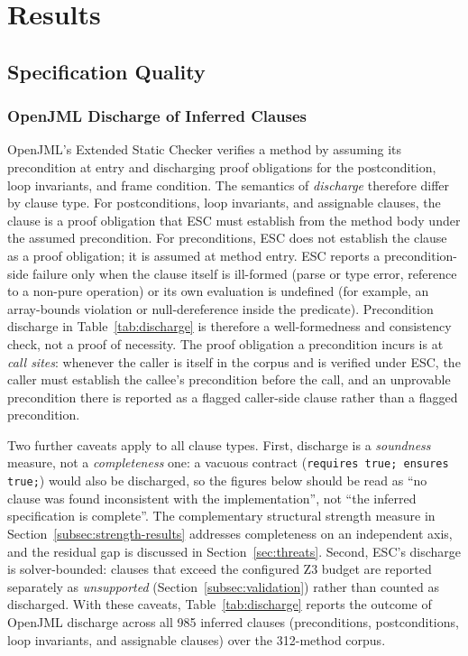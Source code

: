 \section{Results}
\label{sec:results}

\subsection{Specification Quality}

\subsubsection{OpenJML Discharge of Inferred Clauses}
\label{subsec:discharge-results}

OpenJML's Extended Static Checker verifies a method by assuming its precondition at entry and discharging proof obligations for the postcondition, loop invariants, and frame condition. The semantics of \emph{discharge} therefore differ by clause type. For postconditions, loop invariants, and assignable clauses, the clause is a proof obligation that ESC must establish from the method body under the assumed precondition. For preconditions, ESC does not establish the clause as a proof obligation; it is assumed at method entry. ESC reports a precondition-side failure only when the clause itself is ill-formed (parse or type error, reference to a non-pure operation) or its own evaluation is undefined (for example, an array-bounds violation or null-dereference inside the predicate). Precondition discharge in Table~\ref{tab:discharge} is therefore a well-formedness and consistency check, not a proof of necessity. The proof obligation a precondition incurs is at \emph{call sites}: whenever the caller is itself in the corpus and is verified under ESC, the caller must establish the callee's precondition before the call, and an unprovable precondition there is reported as a flagged caller-side clause rather than a flagged precondition.

Two further caveats apply to all clause types. First, discharge is a \emph{soundness} measure, not a \emph{completeness} one: a vacuous contract (\texttt{requires true; ensures true;}) would also be discharged, so the figures below should be read as ``no clause was found inconsistent with the implementation'', not ``the inferred specification is complete''. The complementary structural strength measure in Section~\ref{subsec:strength-results} addresses completeness on an independent axis, and the residual gap is discussed in Section~\ref{sec:threats}. Second, ESC's discharge is solver-bounded: clauses that exceed the configured Z3 budget are reported separately as \emph{unsupported} (Section~\ref{subsec:validation}) rather than counted as discharged. With these caveats, Table~\ref{tab:discharge} reports the outcome of OpenJML discharge across all 985 inferred clauses (preconditions, postconditions, loop invariants, and assignable clauses) over the 312-method corpus.

